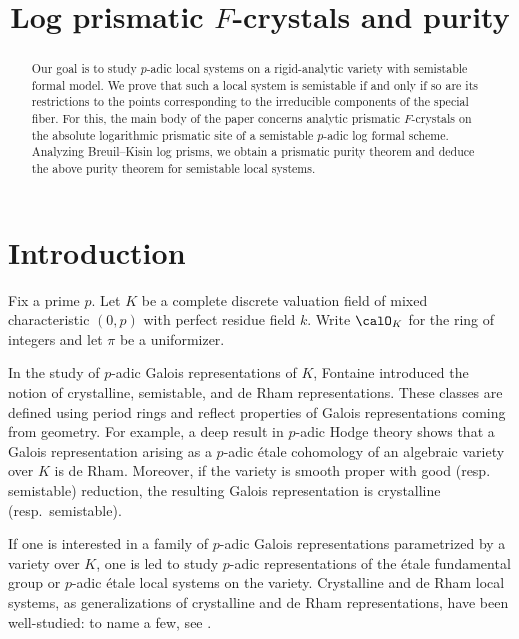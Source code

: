 
\title{Log prismatic $F$-crystals and purity}
\begin{abstract} 
Our goal is to study $p$-adic local systems on a rigid-analytic variety with semistable formal model. We prove that such a local system is semistable if and only if so are its restrictions to the points corresponding to the irreducible components of the special fiber.
For this, the main body of the paper concerns analytic prismatic $F$-crystals on the absolute logarithmic prismatic site of a semistable $p$-adic log formal scheme.  Analyzing Breuil--Kisin log prisms, we obtain a prismatic purity theorem and deduce the above purity theorem for semistable local systems.
\end{abstract}
\maketitle

\tableofcontents
\section{Introduction} \label{sec:introduction}

Fix a prime $p$. Let $K$ be a complete discrete valuation field of mixed characteristic $(0,p)$ with perfect residue field $k$. Write $\calO_K$ for the ring of integers and let $\pi$ be a uniformizer.

In the study of $p$-adic Galois representations of $K$, Fontaine introduced the notion of crystalline, semistable, and de Rham representations. These classes are defined using period rings and reflect properties of Galois representations coming from geometry. For example, a deep result in $p$-adic Hodge theory shows that a Galois representation arising as a $p$-adic \'etale cohomology of an algebraic variety over $K$ is de Rham. Moreover, if the variety is smooth proper with good (resp.~ semistable) reduction, the resulting Galois representation is crystalline (resp.~semistable). 

If one is interested in a family of $p$-adic Galois representations parametrized by a variety over $K$, one is led to study $p$-adic representations of the \'etale fundamental group or $p$-adic \'etale local systems on the variety. Crystalline and de Rham local systems, as generalizations of crystalline and de Rham representations, have been well-studied: to name a few, see \cite{Faltings-CryscohandGalrep,faltings-almostetale, brinon-relative, Andreatta-Iovita-smooth, scholze-p-adic-hodge, Tan-Tong, liu-zhu-rigidity}.

